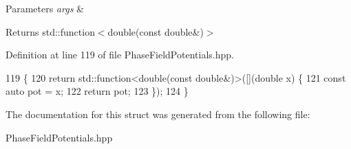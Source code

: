 \begin{DoxyParams}{Parameters}
{\em args} & \\
\hline
\end{DoxyParams}
\begin{DoxyReturn}{Returns}
std\+::function$<$double(const double\&)$>$ 
\end{DoxyReturn}


Definition at line 119 of file Phase\+Field\+Potentials.\+hpp.


\begin{DoxyCode}
119                                                         \{
120     \textcolor{keywordflow}{return} std::function<double(const double&)>([](\textcolor{keywordtype}{double} x) \{
121       \textcolor{keyword}{const} \textcolor{keyword}{auto} pot = x;
122       \textcolor{keywordflow}{return} pot;
123     \});
124   \}
\end{DoxyCode}


The documentation for this struct was generated from the following file\+:\begin{DoxyCompactItemize}
\item 
Phase\+Field\+Potentials.\+hpp\end{DoxyCompactItemize}
